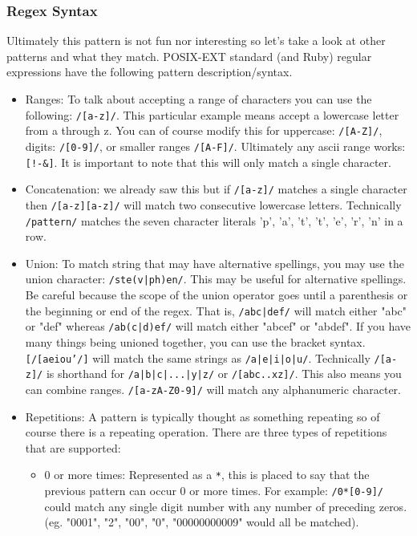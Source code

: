 \documentclass[main.tex]{subfiles}
\begin{document}
\subsubsection{Regex Syntax}
Ultimately this pattern is not fun nor interesting so let's take a look at other patterns and what they match. POSIX-EXT standard (and Ruby) regular expressions have the following pattern description/syntax.
\begin{itemize}
    \item Ranges: To talk about accepting a range of characters you can use the following: \texttt{/[a-z]/}. This particular example means accept a lowercase letter from a through z. You can of course modify this for uppercase: \texttt{/[A-Z]/}, digits: \texttt{/[0-9]/}, or smaller ranges \texttt{/[A-F]/}. Ultimately any ascii range works: \texttt{[!-\&]}. It is important to note that this will only match a single character.
    \item Concatenation: we already saw this but if \texttt{/[a-z]/} matches a single character then \texttt{/[a-z][a-z]/} will match two consecutive lowercase letters. Technically \texttt{/pattern/} matches the seven character literals 'p', 'a', 't', 't', 'e', 'r', 'n' in a row.
    \item Union: To match string that may have alternative spellings, you may use the union character: \texttt{/ste(v|ph)en/}. This may be useful for alternative spellings. Be careful because the scope of the union operator goes until a parenthesis or the beginning or end of the regex. That is, \texttt{/abc|def/} will match either "abc" or "def" whereas \texttt{/ab(c|d)ef/} will match either "abcef" or "abdef". If you have many things being unioned together, you can use the bracket syntax. \texttt{[/[aeiou'/]} will match the same strings as \texttt{/a|e|i|o|u/}. Technically \texttt{/[a-z]/} is shorthand for \texttt{/a|b|c|...|y|z/} or \texttt{/[abc..xz]/}. This also means you can combine ranges. \texttt{/[a-zA-Z0-9]/} will match any alphanumeric character. 
    \item Repetitions: A pattern is typically thought as something repeating so of course there is a repeating operation. There are three types of repetitions that are supported:
    \begin{itemize}
        \item 0 or more times: Represented as a \texttt{*}, this is placed to say that the previous pattern can occur 0 or more times. For example: \texttt{/0*[0-9]/} could match any single digit number with any number of preceding zeros. (eg. "0001", "2", "00", "0", "00000000009" would all be matched). 

\end{itemize}
\end{itemize}
\end{document}
